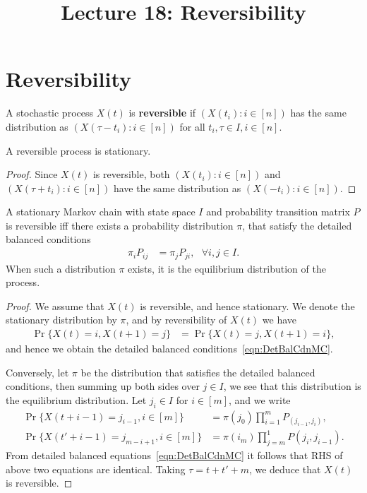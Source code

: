 \documentclass[a4paper,10pt,english]{article}
\title{Lecture 18: Reversibility}
\author{}
\begin{document}
\maketitle

\section{Reversibility}
\begin{defn}
A stochastic process $X(t)$ is \textbf{reversible} if $(X(t_i): i \in [n])$ has the same distribution as $(X(\tau-t_i): i \in [n])$ for all $t_i, \tau \in I, i \in [n]$.
\end{defn}
\begin{lem} A reversible process is stationary.
\end{lem}
\begin{proof}
Since $X(t)$ is reversible, both $(X(t_i): i\in [n])$ and $(X(\tau+t_i): i \in [n])$ have the same distribution as $(X(-t_i): i \in [n])$.
\end{proof}
\begin{thm} A stationary Markov chain with state space $I$ and probability transition matrix $P$ is reversible iff there exists a probability distribution $\pi$, that satisfy the detailed balanced conditions
\begin{align}
\label{eqn:DetBalCdnMC}
\pi_iP_{ij} &= \pi_jP_{ji},~~~ \forall i,j \in I.
\end{align}
When such a distribution $\pi$ exists, it is the equilibrium distribution of the process.
\end{thm}
\begin{proof} We assume that $X(t)$ is reversible, and hence stationary. We denote the stationary distribution by $\pi$, and by reversibility of $X(t)$ we have
\begin{align*}
\Pr\{X(t) = i , X(t+1) = j\} &= \Pr\{X(t) = j, X(t+1) = i\},
\end{align*}
and hence we obtain the detailed balanced conditions~\eqref{eqn:DetBalCdnMC}. 

Conversely, let $\pi$ be the distribution that satisfies the detailed balanced conditions, then
summing up both sides over $j \in I$, we see that this distribution is the equilibrium distribution.
Let $j_i \in I$ for $i \in [m]$, and we write
\begin{align*}
\Pr\{X(t+i-1) = j_{i-1}, i \in [m]\} &= \pi(j_0)\prod_{i=1}^mP_(j_{i-1},j_{i}),\\
\Pr\{X(t'+i-1) = j_{m-i+1}, i \in [m]\} &= \pi(i_m)\prod_{j=m}^{1}P(j_i,j_{i-1}).
\end{align*}
From detailed balanced equations~\eqref{eqn:DetBalCdnMC} it follows that RHS of above two equations are identical. Taking $\tau = t+t'+m$, we deduce that $X(t)$ is reversible.
\end{proof}
\end{document}
